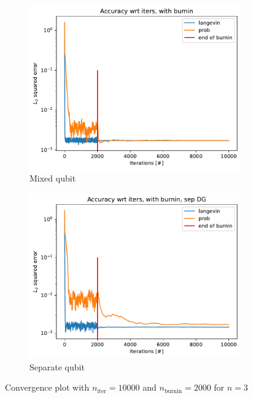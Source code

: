 \documentclass[12pt]{memoir}
\newcommand{\nitern}[1]{$n_{\text{iter}}=#1$}
\newcommand{\nburninn}[1]{$n_{\text{burnin}}=#1$}
\begin{document}
\begin{figure}[H]
    \centering
    \begin{subfigure}[b]{0.49\textwidth}
        \centering
        \includegraphics[width=\textwidth]{figures/experiments/baseline/iters_acc_comp_iters_no_avg-1.png}
        \caption{Mixed qubit}
        \label{fig:conv-plot-mixed-DG-sub}
    \end{subfigure}
    \hfill
    \begin{subfigure}[b]{0.49\textwidth}
        \centering
        \includegraphics[width=\textwidth]{figures/experiments/baseline/iters_acc_comp_iters_no_avg_sep.png}
        \caption{Separate qubit}
        \label{fig:conv-plot-sep-DG-sub}
    \end{subfigure}
    \caption{Convergence plot with \nitern{10000} and \nburninn{2000} for $n=3$}
    \label{fig:conv-plot}
\end{figure}
\end{document}
